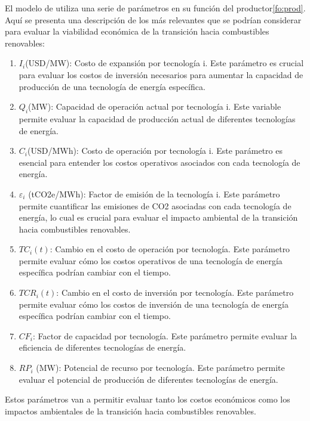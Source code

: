 El modelo de  utiliza una serie de parámetros en su función del productor\ref{fo:prod}. Aquí se presenta una descripción de los más relevantes que se podrían considerar para evaluar la viabilidad económica de la transición hacia combustibles renovables:
\begin{enumerate}

\item 
$I_i$(USD/MW): Costo de expansión por tecnología i. Este parámetro es crucial para evaluar los costos de inversión necesarios para aumentar la capacidad de producción de una tecnología de energía específica.
\item 
$Q_i$(MW): Capacidad de operación actual por tecnología i. Este variable permite evaluar la capacidad de producción actual de diferentes tecnologías de energía.
\item 
$C_i$(USD/MWh): Costo de operación por tecnología i. Este parámetro es esencial para entender los costos operativos asociados con cada tecnología de energía.
\item 

$\varepsilon_{i}$ (tCO2e/MWh): Factor de emisión de la tecnología i. Este parámetro permite cuantificar las emisiones de CO2 asociadas con cada tecnología de energía, lo cual es crucial para evaluar el impacto ambiental de la transición hacia combustibles renovables.
\item 
$TC_i(t)$: Cambio en el costo de operación por tecnología. Este parámetro permite evaluar cómo los costos operativos de una tecnología de energía específica podrían cambiar con el tiempo.
\item 
$TCR_i(t)$: Cambio en el costo de inversión por tecnología. Este parámetro permite evaluar cómo los costos de inversión de una tecnología de energía específica podrían cambiar con el tiempo.
\item 
$CF_i$: Factor de capacidad por tecnología. Este parámetro permite evaluar la eficiencia de diferentes tecnologías de energía.
\item 
$RP_i$ (MW): Potencial de recurso por tecnología. Este parámetro permite evaluar el potencial de producción de diferentes tecnologías de energía.
\end{enumerate}

Estos parámetros van a permitir evaluar tanto los costos económicos como los impactos ambientales de la transición hacia combustibles renovables.